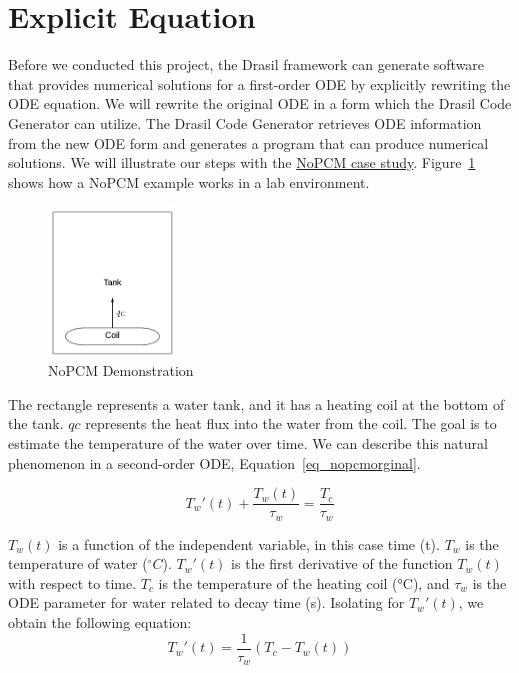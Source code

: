 \section{Explicit Equation}
Before we conducted this project, the Drasil framework can generate software that provides numerical solutions for a first-order ODE by explicitly rewriting the ODE equation. We will rewrite the original ODE in a form which the Drasil Code Generator can utilize. The Drasil Code Generator retrieves ODE information from the new ODE form and generates a program that can produce numerical solutions. We will illustrate our steps with the \href{https://jacquescarette.github.io/Drasil/examples/nopcm/SRS/srs/NoPCM_SRS.html#Sec:IMs}{NoPCM case study}. Figure~\ref{fig_nopcm} shows how a NoPCM example works in a lab environment.
\begin{figure}[ht]
\centering
\includegraphics[width=0.3\textwidth]{figures/NoPCM.png}
\caption{NoPCM Demonstration}
\label{fig_nopcm}
\end{figure}
The rectangle represents a water tank, and it has a heating coil at the bottom of the tank. $qc$ represents the heat flux into the water from the coil. The goal is to estimate the temperature of the water over time. We can describe this natural phenomenon in a second-order ODE, Equation~\ref{eq_nopcmorginal}.

\begin{equation} \label{eq_nopcmorginal}
	T_{w}'(t) +  \frac {T_{w}(t)}{\tau_{w}} = \frac{T_{c}}{\tau_{w}}
\end{equation}

$T_w(t)$ is a function of the independent variable, in this case time (t). $T_w$ is the temperature of water ($ ^\circ C $). $T_w'(t)$ is the first derivative of the function $T_w(t)$ with respect to time. $T_c$ is the temperature of the heating coil (°C), and $\tau_w$ is the ODE parameter for water related to decay time (s). Isolating for $T_w'(t)$, we obtain the following equation:
\begin{equation} \label{eq_nopcmderive}
	T_{w}'(t) = \frac{1}{\tau_{w}} (T_{c} - T_{w}(t))
\end{equation}

